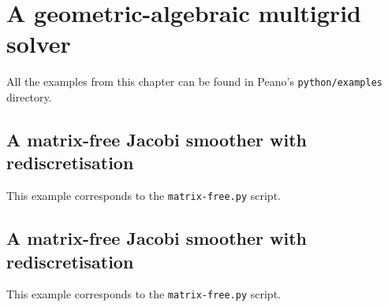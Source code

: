 \chapter{A geometric-algebraic multigrid solver}
\label{section:python-api-examples:multigrid}

All the examples from this chapter can be found in Peano's
\texttt{python/examples} directory.


\section{A matrix-free Jacobi smoother with rediscretisation}

\begin{remark}
 This example corresponds to the \texttt{matrix-free.py} script.
\end{remark}



\section{A matrix-free Jacobi smoother with rediscretisation}

\begin{remark}
 This example corresponds to the \texttt{matrix-free.py} script.
\end{remark}
